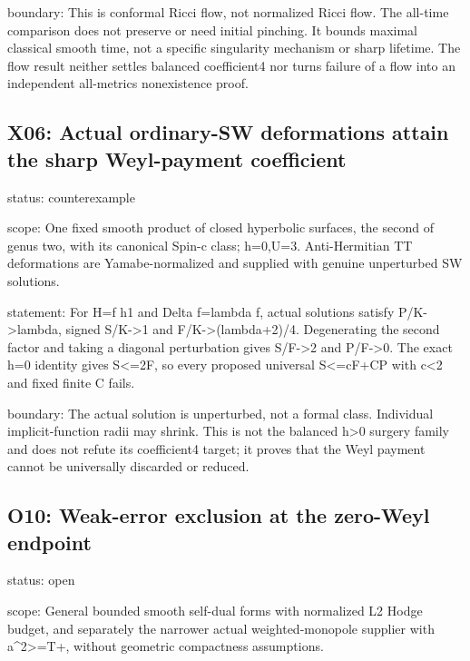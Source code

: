 \documentclass[
  10pt,
]{article}
\begin{document}
boundary: This is conformal Ricci flow, not normalized Ricci flow. The
all-time comparison does not preserve or need initial pinching. It
bounds maximal classical smooth time, not a specific singularity
mechanism or sharp lifetime. The flow result neither settles balanced
coefficient4 nor turns failure of a flow into an independent all-metrics
nonexistence proof.

\hypertarget{x06-actual-ordinary-sw-deformations-attain-the-sharp-weyl-payment-coefficient}{%
\subsection{X06: Actual ordinary-SW deformations attain the sharp
Weyl-payment
coefficient}\label{x06-actual-ordinary-sw-deformations-attain-the-sharp-weyl-payment-coefficient}}

status: counterexample

scope: One fixed smooth product of closed hyperbolic surfaces, the
second of genus two, with its canonical Spin-c class; h=0,U=3.
Anti-Hermitian TT deformations are Yamabe-normalized and supplied with
genuine unperturbed SW solutions.

statement: For H=f h1 and Delta f=lambda f, actual solutions satisfy
P/K-\textgreater lambda, signed S/K-\textgreater1 and
F/K-\textgreater(lambda+2)/4. Degenerating the second factor and taking
a diagonal perturbation gives S/F-\textgreater2 and P/F-\textgreater0.
The exact h=0 identity gives S\textless=2F, so every proposed universal
S\textless=cF+CP with c\textless2 and fixed finite C fails.

boundary: The actual solution is unperturbed, not a formal class.
Individual implicit-function radii may shrink. This is not the balanced
h\textgreater0 surgery family and does not refute its coefficient4
target; it proves that the Weyl payment cannot be universally discarded
or reduced.

\hypertarget{o10-weak-error-exclusion-at-the-zero-weyl-endpoint}{%
\subsection{O10: Weak-error exclusion at the zero-Weyl
endpoint}\label{o10-weak-error-exclusion-at-the-zero-weyl-endpoint}}

status: open

scope: General bounded smooth self-dual forms with normalized L2 Hodge
budget, and separately the narrower actual weighted-monopole supplier
with a\^{}2\textgreater=T+, without geometric compactness assumptions.
\end{document}
